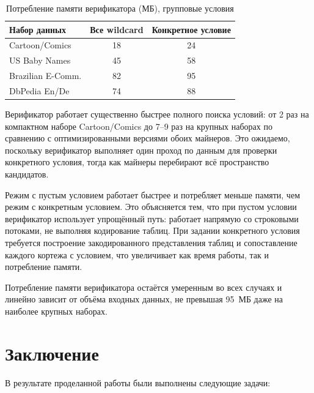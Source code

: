 \begin{table}[h]
\centering
\caption{Потребление памяти верификатора (МБ), групповые условия}
\label{tab:verifier_memory}
\begin{tabular}{|l|c|c|}
\hline
Набор данных & Все wildcard & Конкретное условие \\
\hline
Cartoon/Comics & 18 & 24 \\
US Baby Names & 45 & 58 \\
Brazilian E-Comm. & 82 & 95 \\
DbPedia En/De & 74 & 88 \\
\hline
\end{tabular}
\end{table}

Верификатор работает существенно быстрее полного поиска условий: от 2 раз на компактном наборе Cartoon/Comics до 7--9 раз на крупных наборах по сравнению с оптимизированными версиями обоих майнеров. Это ожидаемо, поскольку верификатор выполняет один проход по данным для проверки конкретного условия, тогда как майнеры перебирают всё пространство кандидатов.

Режим с пустым условием работает быстрее и потребляет меньше памяти, чем режим с конкретным условием. Это объясняется тем, что при пустом условии верификатор использует упрощённый путь: работает напрямую со строковыми потоками, не выполняя кодирование таблиц. При задании конкретного условия требуется построение закодированного представления таблиц и сопоставление каждого кортежа с условием, что увеличивает как время работы, так и потребление памяти.

Потребление памяти верификатора остаётся умеренным во всех случаях и линейно зависит от объёма входных данных, не превышая 95~МБ даже на наиболее крупных наборах.


\section*{Заключение}
\label{sec:conclusion}

В результате проделанной работы были выполнены следующие задачи:

